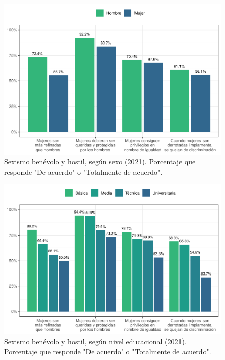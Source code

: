 \documentclass[
  12pt,
]{book}
\begin{document}
\begin{figure}

{\centering \includegraphics{reporte-elsoc_files/figure-latex/sexismo-sexo-1} 

}

\caption{Sexismo benévolo y hostil, según sexo (2021). Porcentaje que responde "De acuerdo" o "Totalmente de acuerdo".}\label{fig:sexismo-sexo}
\end{figure}

\begin{figure}

{\centering \includegraphics{reporte-elsoc_files/figure-latex/sexismo-educ-1} 

}

\caption{Sexismo benévolo y hostil, según nivel educacional (2021). Porcentaje que responde "De acuerdo" o "Totalmente de acuerdo".}\label{fig:sexismo-educ}
\end{figure}
\end{document}
